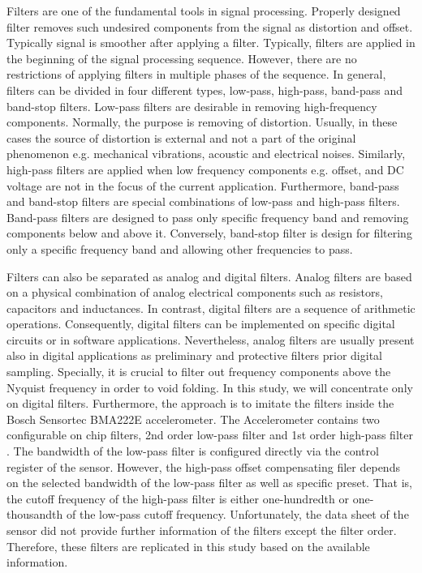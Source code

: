 \documentclass[english,12pt,a4paper,pdftex,elec,utf8]{aaltothesis}
\begin{document}
Filters are one of the fundamental tools in signal processing. Properly designed filter removes such undesired components from the signal as distortion and offset. Typically signal is smoother after applying a filter. Typically, filters are applied in the beginning of the signal processing sequence. However, there are no restrictions of applying filters in multiple phases of the sequence. In general, filters can be divided in four different types, low-pass, high-pass, band-pass and band-stop filters. Low-pass filters are desirable in removing high-frequency components. Normally, the purpose is removing of distortion. Usually, in these cases the source of distortion is external and not a part of the original phenomenon e.g. mechanical vibrations, acoustic and electrical noises. Similarly, high-pass filters are applied when low frequency components e.g. offset, and DC voltage are not in the focus of the current application. Furthermore, band-pass and band-stop filters are special combinations of low-pass and high-pass filters. Band-pass filters are designed to pass only specific frequency band and removing components below and above it. Conversely, band-stop filter is design for filtering only a specific frequency band and allowing other frequencies to pass. \cite{digitalfilters} \cite{khan2005digital}

Filters can also be separated as analog and digital filters. Analog filters are based on a physical combination of analog electrical components such as resistors, capacitors and inductances. In contrast, digital filters are a sequence of arithmetic operations. Consequently, digital filters can be implemented on specific digital circuits or in software applications. Nevertheless, analog filters are usually present also in digital applications as preliminary and protective filters prior digital sampling. Specially, it is crucial to filter out frequency components above the Nyquist frequency in order to void folding. In this study, we will concentrate only on digital filters. Furthermore, the approach is to imitate the filters inside the Bosch Sensortec BMA222E accelerometer. The Accelerometer contains two configurable on chip filters, 2nd order low-pass filter and 1st order high-pass filter \cite{bma222datasheet}. The bandwidth of the low-pass filter is configured directly via the control register of the sensor. However, the high-pass offset compensating filer depends on the selected bandwidth of the low-pass filter as well as specific preset. That is, the cutoff frequency of the high-pass filter is either one-hundredth or one-thousandth of the low-pass cutoff frequency. Unfortunately, the data sheet of the sensor did not provide further information of the filters except the filter order. Therefore, these filters are replicated in this study based on the available information.
\end{document}
